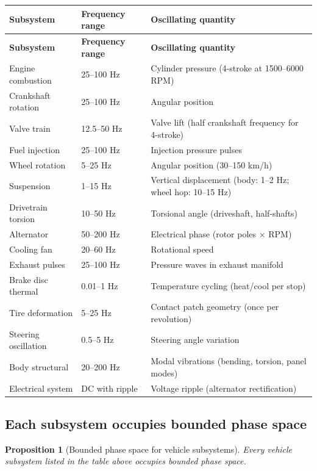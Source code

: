 \documentclass[twocolumn,10pt,a4paper]{article}
\newtheorem{proposition}[theorem]{Proposition}
\theoremstyle{definition}
\theoremstyle{remark}
\begin{document}
\begin{longtable}{p{3.5cm} p{3.5cm} p{5cm}}
\toprule
\textbf{Subsystem} & \textbf{Frequency range} & \textbf{Oscillating quantity} \\
\midrule
\endfirsthead
\toprule
\textbf{Subsystem} & \textbf{Frequency range} & \textbf{Oscillating quantity} \\
\midrule
\endhead
\bottomrule
\endlastfoot
Engine combustion & 25--100 Hz & Cylinder pressure (4-stroke at 1500--6000 RPM) \\
Crankshaft rotation & 25--100 Hz & Angular position \\
Valve train & 12.5--50 Hz & Valve lift (half crankshaft frequency for 4-stroke) \\
Fuel injection & 25--100 Hz & Injection pressure pulses \\
Wheel rotation & 5--25 Hz & Angular position (30--150 km/h) \\
Suspension & 1--15 Hz & Vertical displacement (body: 1--2 Hz; wheel hop: 10--15 Hz) \\
Drivetrain torsion & 10--50 Hz & Torsional angle (driveshaft, half-shafts) \\
Alternator & 50--200 Hz & Electrical phase (rotor poles $\times$ RPM) \\
Cooling fan & 20--60 Hz & Rotational speed \\
Exhaust pulses & 25--100 Hz & Pressure waves in exhaust manifold \\
Brake disc thermal & 0.01--1 Hz & Temperature cycling (heat/cool per stop) \\
Tire deformation & 5--25 Hz & Contact patch geometry (once per revolution) \\
Steering oscillation & 0.5--5 Hz & Steering angle variation \\
Body structural & 20--200 Hz & Modal vibrations (bending, torsion, panel modes) \\
Electrical system & DC with ripple & Voltage ripple (alternator rectification) \\
\end{longtable}

\subsection{Each subsystem occupies bounded phase space}

\begin{proposition}[Bounded phase space for vehicle subsystems]\label{prop:vehicle_bounded}
Every vehicle subsystem listed in the table above occupies bounded phase space.
\end{proposition}
\end{document}

